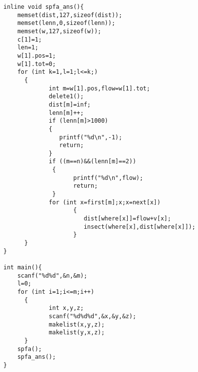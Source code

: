 \begin{lstlisting}
inline void spfa_ans(){
    memset(dist,127,sizeof(dist));
    memset(lenn,0,sizeof(lenn));
    memset(w,127,sizeof(w));
    c[1]=1;
    len=1;
    w[1].pos=1;
    w[1].tot=0;
    for (int k=1,l=1;l<=k;)
      {
             int m=w[1].pos,flow=w[1].tot;
             delete1();
             dist[m]=inf;
             lenn[m]++;
             if (lenn[m]>1000) 
             {
                printf("%d\n",-1);
                return;
             }
             if ((m==n)&&(lenn[m]==2)) 
              {
                    printf("%d\n",flow);
                    return;
              }
             for (int x=first[m];x;x=next[x])
                    {
                       dist[where[x]]=flow+v[x];
                       insect(where[x],dist[where[x]]);
                    }
      }
}
    
int main(){
    scanf("%d%d",&n,&m);
    l=0;
    for (int i=1;i<=m;i++)
      {
             int x,y,z;
             scanf("%d%d%d",&x,&y,&z);
             makelist(x,y,z);
             makelist(y,x,z);
      }
    spfa();
    spfa_ans();
}
\end{lstlisting}

